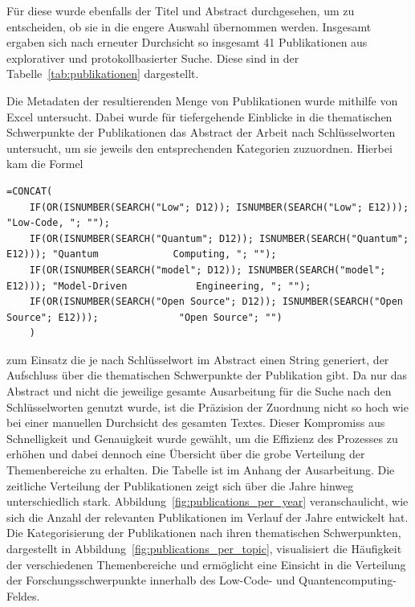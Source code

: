 Für diese wurde ebenfalls der Titel und Abstract durchgesehen, um zu entscheiden, ob sie in die engere Auswahl übernommen werden. 
Insgesamt ergaben sich nach erneuter Durchsicht so insgesamt 41 Publikationen aus explorativer und protokollbasierter Suche. 
Diese sind in der Tabelle~\ref{tab:publikationen} dargestellt. 

Die Metadaten der resultierenden Menge von Publikationen wurde mithilfe von Excel untersucht. Dabei wurde für tiefergehende Einblicke in die 
thematischen Schwerpunkte der Publikationen das Abstract der Arbeit nach Schlüsselworten untersucht, um sie jeweils den entsprechenden 
Kategorien zuzuordnen. Hierbei kam die Formel 
\begin{lstlisting}[caption=Excel Formel zur Suche von Worten im Abstract]
=CONCAT(
    IF(OR(ISNUMBER(SEARCH("Low"; D12)); ISNUMBER(SEARCH("Low"; E12))); "Low-Code, "; "");
    IF(OR(ISNUMBER(SEARCH("Quantum"; D12)); ISNUMBER(SEARCH("Quantum"; E12))); "Quantum             Computing, "; "");
    IF(OR(ISNUMBER(SEARCH("model"; D12)); ISNUMBER(SEARCH("model"; E12))); "Model-Driven            Engineering, "; "");
    IF(OR(ISNUMBER(SEARCH("Open Source"; D12)); ISNUMBER(SEARCH("Open Source"; E12)));              "Open Source"; "")
    )
\end{lstlisting}
zum Einsatz die je nach Schlüsselwort im Abstract einen String generiert, der Aufschluss über die thematischen Schwerpunkte der Publikation gibt. 
Da nur das Abstract und nicht die jeweilige gesamte Ausarbeitung für die Suche nach den Schlüsselworten genutzt wurde, ist die Präzision der Zuordnung 
nicht so hoch wie bei einer manuellen Durchsicht des gesamten Textes. Dieser Kompromiss aus Schnelligkeit und Genauigkeit wurde gewählt, um die 
Effizienz des Prozesses zu erhöhen und dabei dennoch eine Übersicht über die grobe Verteilung der Themenbereiche zu erhalten. Die Tabelle ist im Anhang der 
Ausarbeitung. 
Die zeitliche Verteilung der Publikationen zeigt sich über die Jahre hinweg unterschiedlich stark. Abbildung~\ref{fig:publications_per_year} 
veranschaulicht, wie sich die Anzahl der relevanten Publikationen im Verlauf der Jahre entwickelt hat. 
Die Kategorisierung der Publikationen nach ihren thematischen Schwerpunkten, dargestellt in Abbildung~\ref{fig:publications_per_topic}, 
visualisiert die Häufigkeit der verschiedenen Themenbereiche und ermöglicht eine Einsicht in die Verteilung der 
Forschungsschwerpunkte innerhalb des Low-Code- und Quantencomputing-Feldes. 

